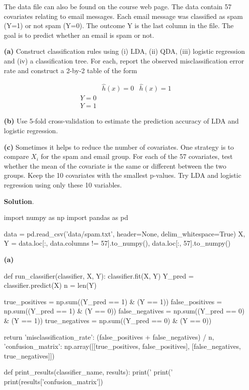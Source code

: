 The data file can also be found on the course web page. The data contain
57 covariates relating to email messages. Each email message was
classified as spam (Y=1) or not spam (Y=0). The outcome Y is the last
column in the file. The goal is to predict whether an email is spam or
not.

\textbf{(a)} Construct classification rules using (i) LDA, (ii) QDA,
(iii) logistic regression and (iv) a classification tree. For each,
report the observed misclassification error rate and construct a 2-by-2
table of the form

\[
\begin{array}{c|cc}
 & \hat{h}(x) = 0 & \hat{h}(x) = 1 \\
\hline
Y = 0 \\
Y = 1
\end{array}
\]

\textbf{(b)} Use 5-fold cross-validation to estimate the prediction
accuracy of LDA and logistic regression.

\textbf{(c)} Sometimes it helps to reduce the number of covariates. One
strategy is to compare \(X_{i}\) for the spam and email group. For each of
the 57 covariates, test whether the mean of the covariate is the same or
different between the two groups. Keep the 10 covariates with the
smallest p-values. Try LDA and logistic regression using only these 10
variables.

\textbf{Solution}.

\begin{python}
import numpy as np
import pandas as pd

data = pd.read_csv('data/spam.txt', header=None, delim_whitespace=True)
X, Y = data.loc[:, data.columns != 57].to_{n}umpy(), data.loc[:, 57].to_{n}umpy()
\end{python}

\textbf{(a)}

\begin{python}
def run_classifier(classifier, X, Y):
    classifier.fit(X, Y)
    Y_pred = classifier.predict(X)
    n = len(Y)
    
    true_positives = np.sum((Y_pred == 1) & (Y == 1))
    false_positives = np.sum((Y_pred == 1) & (Y == 0))
    false_{n}egatives = np.sum((Y_pred == 0) & (Y == 1))
    true_{n}egatives = np.sum((Y_pred == 0) & (Y == 0))

    return {
        'misclassification_rate': (false_positives + false_{n}egatives) / n,
        'confusion_matrix': np.array([[true_positives, false_positives], [false_{n}egatives, true_{n}egatives]])
    }

def print_results(classifier_{n}ame, results):
    print('%
    print('%
    print(results['confusion_matrix'])
\end{python}

